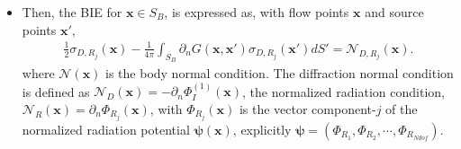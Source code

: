 \documentclass[12pt,a4paper,titlepage]{article}
\newcommand{\bs}{\boldsymbol}
\begin{document}
\begin{itemize}
\item Then, the BIE for $\bs x \in S_B$, is expressed as, with flow points $\bs x$ and source points $\bs x'$,
\begin{align}
\frac{1}{2}\sigma_{D,R_j}(\bs x)-\frac{1}{4\pi}\int_{S_B} \partial_n G(\bs x, \bs x') \sigma_{D,R_j}(\bs x') dS'=\mathcal{N}_{D,R_j}(\bs x). \label{Eq:BIE_source_distribution}
\end{align}
where $\mathcal{N}(\bs x)$ is the body normal condition. The diffraction normal condition is defined as $\mathcal{N}_D (\bs x)=-\partial_{n} \Phi_I^{(1)}(\bs x)$, the normalized radiation condition, $\mathcal{N}_R (\bs x)=\partial_{n} \Phi_{R_j}(\bs x)$, with $\Phi_{R_j}(\bs x)$ is the vector component-$j$ of the normalized radiation potential $\bs \psi(\bs x)$, explicitly $\bs \psi=(\Phi_{R_1},\Phi_{R_2},\cdots,\Phi_{R_{Ndof}})$.


\end{itemize}
\end{document}
